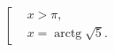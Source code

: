 \documentclass[preview]{standalone}
\begin{document}
\begin{align*}
\left[ \begin{aligned}& x > \pi, \\& x = \operatorname{arctg}\sqrt{5}.\end{aligned} \right.
\end{align*}
\end{document}
